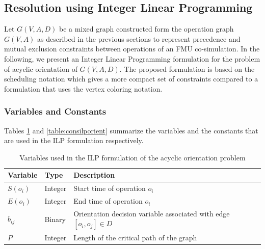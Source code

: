%

\subsection{Resolution using Integer Linear Programming}

Let $G(V,A,D)$ be a mixed graph constructed form the operation graph $G(V,A)$ as described in the previous sections to represent precedence and mutual exclusion constraints between operations of an FMU co-simulation. In the following, we present an Integer Linear Programming formulation for the problem of acyclic orientation of $G(V,A,D)$. The proposed formulation is based on the scheduling notation which gives a more compact set of constraints compared to a formulation that uses the vertex coloring notation.

\subsubsection{Variables and Constants}

Tables \ref{table:varilporient} and \ref{table:consilporient} summarize the variables and the constants that are used in the ILP formulation respectively.

\begin{table}[!htbp]
\caption{Variables used in the ILP formulation of the acyclic orientation problem}
\centering
\label{table:varilporient}
\begin{tabular}{l l l}
\toprule
Variable & Type & Description  \\
\midrule
 $S(o_i)$ & Integer & Start time of operation $o_i$\\
 $E(o_i)$ & Integer & End time of operation $o_i$\\
 $b_{ij}$ & Binary & Orientation decision variable associated with edge $[o_i,o_j] \in D$\\
 $P$ & Integer & Length of the critical path of the graph\\
\bottomrule
\end{tabular}
\end{table}

